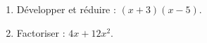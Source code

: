
\begin{exercice}\label{exo2smath-0153}

    \begin{enumerate}
        \item
            Développer et réduire : \( (x+3)(x-5)\).
        \item
            Factoriser : \( 4x+12x^2\).
    \end{enumerate}

\end{exercice}
